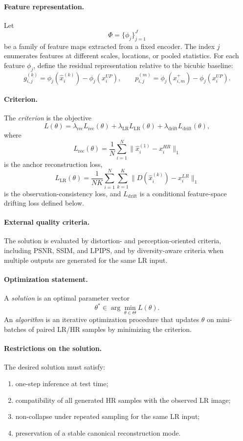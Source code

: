 \documentclass{article}
\begin{document}
\paragraph{Feature representation.}
Let
\[
\Phi=\{\phi_j\}_{j=1}^{J}
\]
be a family of feature maps extracted from a fixed encoder. The index \(j\) enumerates features at different scales, locations, or pooled statistics. For each feature \(\phi_j\), define the residual representation relative to the bicubic baseline:
\[
g_{i,j}^{(k)} = \phi_j(\hat{x}_i^{(k)}) - \phi_j(x_i^{UP}),
\qquad
p_{i,j}^{(m)} = \phi_j(x_{i,m}^{+}) - \phi_j(x_i^{UP}).
\]

\paragraph{Criterion.}
The \emph{criterion} is the objective
\[
L(\theta)
=
\lambda_{\mathrm{rec}}L_{\mathrm{rec}}(\theta)
+
\lambda_{\mathrm{LR}}L_{\mathrm{LR}}(\theta)
+
\lambda_{\mathrm{drift}}L_{\mathrm{drift}}(\theta),
\]
where
\[
L_{\mathrm{rec}}(\theta)
=
\frac{1}{N}\sum_{i=1}^{N}
\bigl\|
\hat{x}_i^{(1)}-x_i^{HR}
\bigr\|_1
\]
is the anchor reconstruction loss,
\[
L_{\mathrm{LR}}(\theta)
=
\frac{1}{NK}\sum_{i=1}^{N}\sum_{k=1}^{K}
\bigl\|
D(\hat{x}_i^{(k)})-x_i^{LR}
\bigr\|_1
\]
is the observation-consistency loss, and \(L_{\mathrm{drift}}\) is a conditional feature-space drifting loss defined below.

\paragraph{External quality criteria.}
The solution is evaluated by distortion- and perception-oriented criteria, including PSNR, SSIM, and LPIPS, and by diversity-aware criteria when multiple outputs are generated for the same LR input.

\paragraph{Optimization statement.}
A \emph{solution} is an optimal parameter vector
\[
\theta^\ast \in \arg\min_{\theta\in\Theta} L(\theta).
\]
An \emph{algorithm} is an iterative optimization procedure that updates \(\theta\) on mini-batches of paired LR/HR samples by minimizing the criterion.

\paragraph{Restrictions on the solution.}
The desired solution must satisfy:
\begin{enumerate}
    \item one-step inference at test time;
    \item compatibility of all generated HR samples with the observed LR image;
    \item non-collapse under repeated sampling for the same LR input;
    \item preservation of a stable canonical reconstruction mode.
\end{enumerate}
\end{document}
